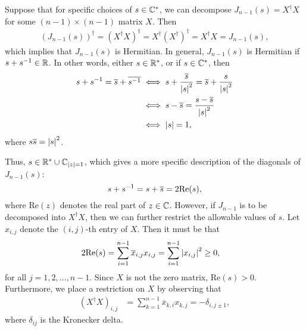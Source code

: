 






Suppose that for specific choices of $s\in\mathbb{C}^*$, we can decompose $J_{n-1}(s) = X^\dagger X$ for some $(n-1)\times(n-1)$ matrix $X$. Then
\begin{align*}
    {\left( J_{n-1}(s) \right)}^\dagger = {\left( X^\dagger X \right)}^\dagger = X^\dagger {\left( X^\dagger \right)}^\dagger = X^\dagger X = J_{n-1}(s),
\end{align*}
which implies that $J_{n-1}(s)$ is Hermitian. In general, $J_{n-1}(s)$ is Hermitian if $s+{ s }^{-1}\in\mathbb{R}$. In other words, either $s\in\mathbb{R}^*$, or if $s\in\mathbb{C}^*$, then
\begin{align*}
    s+{ s }^{-1} = \overline{s}+\overline{{ s }^{-1}} &\iff s+\frac{\overline{s}}{\left|s\right|^2} = \overline{s}+\frac{s}{\left|s\right|^2} \\
    &\iff s-\overline{s} = \frac{s-\overline{s}}{\left|s\right|^2} \\
    &\iff \left|s\right| = 1,
\end{align*}
where $s\overline{s}=\left|s\right|^2$. 

Thus, $s\in\mathbb{R}^*\cup\mathbb{C}_{\left|z\right|=1}$, which gives a more specific description of the diagonals of $J_{n-1}(s)$:
\begin{equation}
    s+{ s }^{-1} = s+\overline{s} = 2\textrm{Re}(s),
\end{equation}
where $\textrm{Re}(z)$ denotes the real part of $z\in\mathbb{C}$. However, if $J_{n-1}$ is to be decomposed into $X^\dagger X$, then we can further restrict the allowable values of $s$. Let $x_{i,j}$ denote the $(i,j)$-th entry of $X$. Then it must be that
\begin{align*}
    2\textrm{Re}(s) &= \sum_{i=1}^{n-1}\overline{x}_{i,j} x_{i,j} = \sum_{i=1}^{n-1}\left|x_{i,j}\right|^2 \geq 0,
\end{align*}
for all $j=1,2,\dots,n-1$. Since $X$ is not the zero matrix, $\textrm{Re}(s) > 0$. Furthermore, we place a restriction on $X$ by observing that
\begin{align*}
    {\left( X^\dagger X \right)}_{i,j} &= \sum_{k=1}^{n-1} \overline{x}_{k,i}x_{k,j} = -\delta_{i,j\pm 1},
\end{align*}
where $\delta_{ij}$ is the Kronecker delta.

